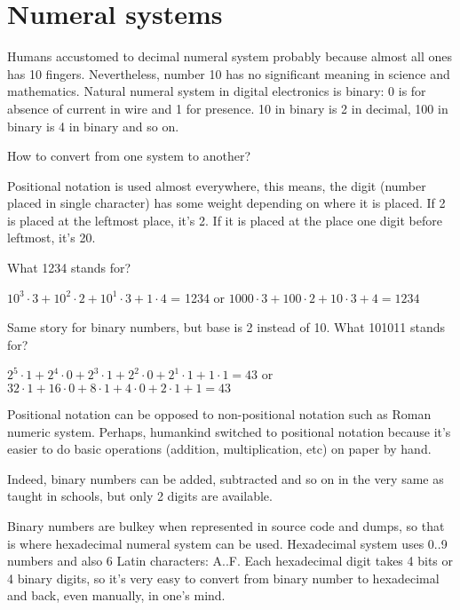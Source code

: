 \section{Numeral systems}

Humans accustomed to decimal numeral system probably because almost all ones has 10 fingers.
Nevertheless, number 10 has no significant meaning in science and mathematics.
Natural numeral system in digital electronics is binary: 0 is for absence of current in wire and 1 for presence.
10 in binary is 2 in decimal, 100 in binary is 4 in binary and so on.

How to convert from one system to another?

Positional notation is used almost everywhere, this means, the digit (number placed in single character) has some weight depending on where it is placed.
If 2 is placed at the leftmost place, it's 2.
If it is placed at the place one digit before leftmost, it's 20.

What 1234 stands for?

$10^3 \cdot 3 + 10^2 \cdot 2 + 10^1 \cdot 3 + 1 \cdot 4$ = 1234 or 
$1000 \cdot 3 + 100 \cdot 2 + 10 \cdot 3 + 4 = 1234$

Same story for binary numbers, but base is 2 instead of 10.
What 101011 stands for?

$2^5 \cdot 1 + 2^4 \cdot 0 + 2^3 \cdot 1 + 2^2 \cdot 0 + 2^1 \cdot 1 + 1 \cdot 1 = 43$ or
$32 \cdot 1 + 16 \cdot 0 + 8 \cdot 1 + 4 \cdot 0 + 2 \cdot 1 + 1 = 43$

Positional notation can be opposed to non-positional notation such as Roman numeric system.
Perhaps, humankind switched to positional notation because it's easier to do basic operations (addition, multiplication, etc) on paper by hand.

Indeed, binary numbers can be added, subtracted and so on in the very same as taught in schools, but only 2 digits are available.

Binary numbers are bulkey when represented in source code and dumps, so that is where hexadecimal numeral system can be used.
Hexadecimal system uses 0..9 numbers and also 6 Latin characters: A..F.
Each hexadecimal digit takes 4 bits or 4 binary digits, so it's very easy to convert from binary number to hexadecimal and back, even manually, in one's mind.

